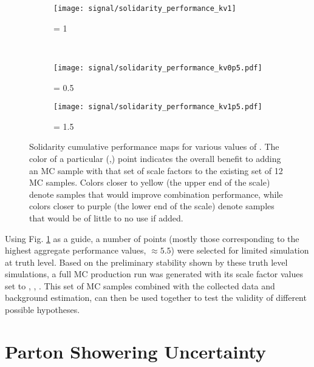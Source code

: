     \begin{figure}[tbh]
        \begin{subfigure}{0.5\textwidth}
            \texttt{[image: signal/solidarity\_performance\_kv1]}
            \captionsetup{justification=centering} \caption{\kv = 1}
        \end{subfigure}\\
        \begin{subfigure}{0.5\textwidth}
            \texttt{[image: signal/solidarity\_performance\_kv0p5.pdf]}
            \captionsetup{justification=centering} \caption{\kv = 0.5}
        \end{subfigure}
        \begin{subfigure}{0.5\textwidth}
            \texttt{[image: signal/solidarity\_performance\_kv1p5.pdf]}
            \captionsetup{justification=centering} \caption{\kv = 1.5}
        \end{subfigure}
        \caption{
            Solidarity cumulative performance maps for various values of \kv.
            The color of a particular (\kvv,\kl) point indicates the overall
                benefit to adding an MC sample with that set of scale factors
                to the existing set of 12 MC samples.
            Colors closer to yellow (the upper end of the scale) denote samples that would improve combination performance,
                while colors closer to purple (the lower end of the scale) denote samples that would be of little to no use if added.
        }
        \label{fig:solidarity_performance_map}
    \end{figure}

    Using Fig. \ref{fig:solidarity_performance_map} as a guide,
        a number of points (mostly those corresponding to the highest aggregate performance values, $\approx 5.5$)
        were selected for limited simulation at truth level.
    Based on the preliminary stability shown by these truth level simulations,
        a full MC production run was generated with its scale factor values set to , , .
    This set of MC samples combined with the collected data and background estimation,
        can then be used together to test the validity of different possible hypotheses.

\FloatBarrier
\section{Parton Showering Uncertainty}\label{sec:sig_syst}


